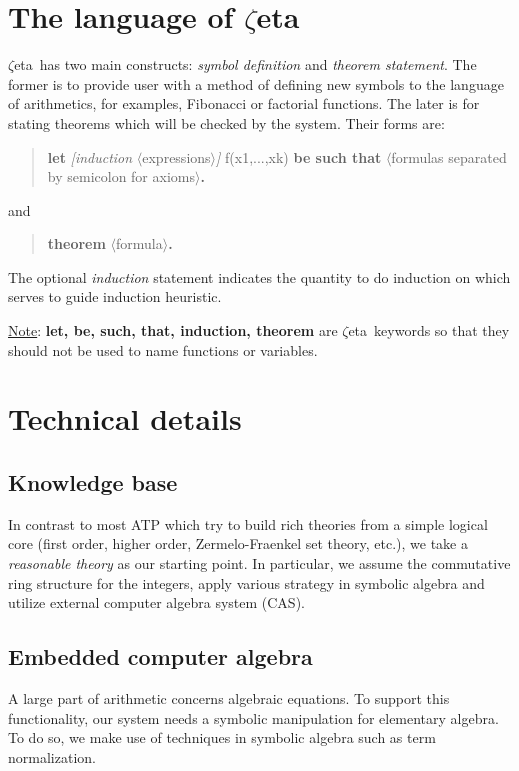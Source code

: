\documentclass[12pt]{article}
\newcommand{\zetatp}{$\zeta$eta}
\begin{document}
\section{The language of \zetatp}

\zetatp\ has two main constructs: \emph{symbol definition} and \emph{theorem statement}. The former is to provide user with a method of defining new symbols to the language of arithmetics, for examples, Fibonacci or factorial functions. The later is for stating theorems which will be checked by the system. Their forms are:
\begin{quote}
{\bf let} {\it [induction} $\langle$expressions$\rangle${\it]} f(x1,...,xk) {\bf be such that} $\langle$formulas separated by semicolon for axioms$\rangle${\bf .}
\end{quote}
and
\begin{quote}
{\bf theorem} $\langle$formula$\rangle${\bf .}
\end{quote}
The optional {\it induction} statement indicates the quantity to do induction on which serves to guide induction heuristic.

\underline{Note}: \textbf{let, be, such, that, induction, theorem} are \zetatp\ keywords so that they should not be used to name functions or variables.

\section{Technical details}

\subsection{Knowledge base}

In contrast to most ATP which try to build rich theories from a simple logical core (first order, higher order, Zermelo-Fraenkel set theory, etc.), we take a \emph{reasonable theory} as our starting point. In particular, we assume the commutative ring structure for the integers, apply various strategy in symbolic algebra and utilize external computer algebra system (CAS).



\subsection{Embedded computer algebra}

A large part of arithmetic concerns algebraic equations. To support this functionality, our system needs a symbolic manipulation for elementary algebra. To do so, we make use of techniques in symbolic algebra such as term normalization.
\end{document}
